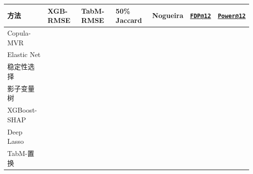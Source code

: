 \documentclass[UTF8,11pt,a4paper]{ctexart}
\begin{document}
{\def\LTcaptype{none} %
{
\footnotesize
\begin{longtable}[]{@{}
  >{\raggedright\arraybackslash}p{}
  >{\raggedright\arraybackslash}p{}
  >{\raggedright\arraybackslash}p{}
  >{\raggedright\arraybackslash}p{}
  >{\raggedright\arraybackslash}p{}
  >{\raggedright\arraybackslash}p{}
  >{\raggedright\arraybackslash}p{}@{}}
\toprule\noalign{}
\begin{minipage}[b]{\linewidth}\raggedright
方法
\end{minipage} & \begin{minipage}[b]{\linewidth}\raggedright
XGB-RMSE
\end{minipage} & \begin{minipage}[b]{\linewidth}\raggedright
TabM-RMSE
\end{minipage} & \begin{minipage}[b]{\linewidth}\raggedright
50\% Jaccard
\end{minipage} & \begin{minipage}[b]{\linewidth}\raggedright
Nogueira
\end{minipage} & \begin{minipage}[b]{\linewidth}\raggedright
\href{mailto:FDP@12}{\nolinkurl{FDP@12}}
\end{minipage} & \begin{minipage}[b]{\linewidth}\raggedright
\href{mailto:Power@12}{\nolinkurl{Power@12}}
\end{minipage} \\
\midrule\noalign{}
\endhead
\bottomrule\noalign{}
\endlastfoot
Copula-MVR & 1.8650 & 1.8967 & 0.7355 & 0.6798 & 0.3218 & 0.8305 \\
Elastic Net & 1.8625 & 1.8806 & 0.7244 & 0.6185 & 0.3251 & 0.8265 \\
稳定性选择 & 1.8937 & 1.8885 & 0.5827 & 0.4788 & 0.3383 & 0.8107 \\
影子变量树 & 1.8611 & 1.8612 & 0.9388 & 0.9210 & 0.3361 & 0.8261 \\
XGBoost-SHAP & 1.8466 & 1.8571 & 0.7682 & 0.7439 & 0.2315 & 0.9403 \\
Deep Lasso & 1.8450 & 1.8594 & 0.8230 & 0.7754 & 0.2687 & 0.8947 \\
TabM-置换 & 1.8458 & 1.8586 & 0.7505 & 0.7304 & 0.2656 & 0.8981 \\

\end{longtable}}}
\end{document}
